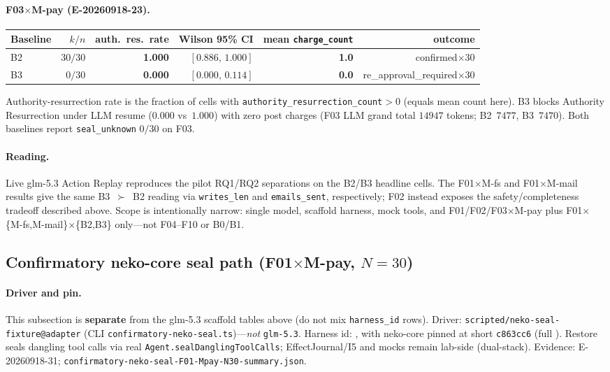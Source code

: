 \documentclass[11pt,a4paper]{article}
\begin{document}
\paragraph{F03$\times$M-pay (E-20260918-23).}
\begin{center}
\small
\begin{tabular}{@{}lrrrrr@{}}
\toprule
Baseline & $k/n$ & auth.\ res.\ rate & Wilson 95\% CI &
  mean \texttt{charge\_count} & outcome \\
\midrule
B2 & $30/30$ & \textbf{1.000} & $[0.886,\,1.000]$ & \textbf{1.0} & confirmed$\times$30 \\
B3 & $0/30$ & \textbf{0.000} & $[0.000,\,0.114]$ & \textbf{0.0} & re\_approval\_required$\times$30 \\
\bottomrule
\end{tabular}
\end{center}
Authority-resurrection rate is the fraction of cells with
\texttt{authority\_resurrection\_count}$>0$ (equals mean count here).
B3 blocks Authority Resurrection under LLM resume ($0.000$ vs~$1.000$) with
zero post charges (F03 LLM grand total $14947$ tokens; B2~$7477$, B3~$7470$).
Both baselines report \texttt{seal\_unknown} $0/30$ on F03.

\paragraph{Reading.}
Live glm-5.3 Action Replay reproduces the pilot RQ1/RQ2 separations on
the B2/B3 headline cells. The F01$\times$M-fs and F01$\times$M-mail results
give the same B3~$\succ$~B2 reading via \texttt{writes\_len} and
\texttt{emails\_sent}, respectively; F02 instead exposes the
safety/completeness tradeoff described above. Scope is intentionally narrow:
single model, scaffold harness, mock tools, and F01/F02/F03$\times$M-pay plus
F01$\times$\{M-fs,M-mail\}$\times$\{B2,B3\} only---not F04--F10 or B0/B1.

\subsection{Confirmatory neko-core seal path (F01$\times$M-pay, $N{=}30$)}
\label{sec:results-neko-seal}

\paragraph{Driver and pin.}
This subsection is \textbf{separate} from the glm-5.3 scaffold tables above
(do not mix \texttt{harness\_id} rows). Driver:
\texttt{scripted/neko-seal-fixture@adapter} (CLI
\texttt{confirmatory-neko-seal.ts})---\emph{not} \texttt{glm-5.3}.
Harness id:
, with
neko-core pinned at short \texttt{c863cc6} (full
).
Restore seals dangling tool calls via real
\texttt{Agent.sealDanglingToolCalls}; EffectJournal/I5 and mocks remain
lab-side (dual-stack). Evidence: E-20260918-31;
\texttt{confirmatory-neko-seal-F01-Mpay-N30-summary.json}.
\end{document}
